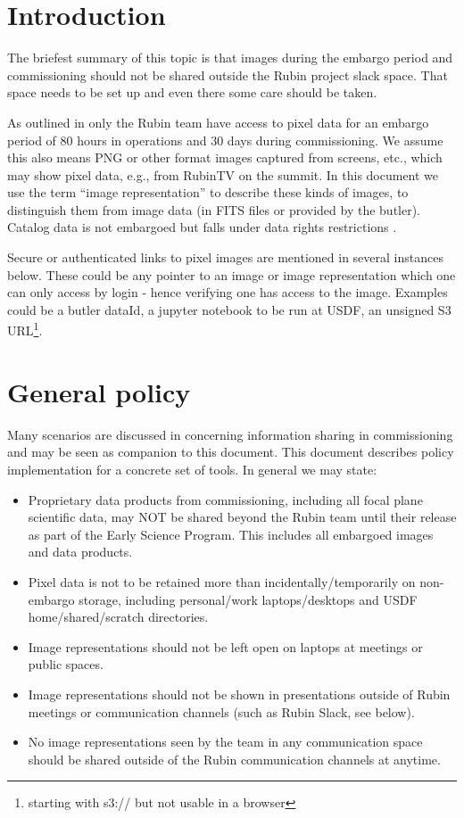 
\section{Introduction}
The briefest summary of this topic is that images during the embargo period and commissioning should not be shared outside the Rubin project slack space.
That space needs to be set up and even there some care should be taken.

As outlined in  only the Rubin team have access to pixel data for an embargo period of 80 hours in operations and 30 days during commissioning. We assume this also means PNG or other format images captured from screens, etc., which may show pixel data, e.g., from RubinTV on the summit.
In this document we use the term ``image representation'' to describe these kinds of images, to distinguish them from image data (in FITS files or provided by the butler).
Catalog data is not embargoed but falls under data rights restrictions .

Secure or authenticated links to pixel images are mentioned in several instances below.
These could be any pointer to an image or image representation which one can only access by login - hence verifying one has access to the image. Examples could be a butler dataId, a jupyter notebook to be run at USDF, an unsigned S3 URL\footnote{starting with s3:// but not usable in a browser}.


\section{General policy} \label{sec:genpol}
Many scenarios are discussed in  concerning information sharing in commissioning and may be seen as companion to this document.
This document describes policy implementation for a concrete set of tools.
In general we may state:

\begin{itemize}
\item Proprietary data products from commissioning, including all focal plane scientific data, may NOT be shared beyond the Rubin team until their release as part of the Early Science Program. This includes all embargoed images and data products.
\item Pixel data is not to be retained more than incidentally/temporarily on non-embargo storage, including personal/work laptops/desktops and USDF home/shared/scratch directories.
\item Image representations should not be left open on laptops at meetings or public spaces.
\item Image representations should not be shown in presentations outside of Rubin meetings or communication channels (such as Rubin Slack, see below).
\item No image representations seen by the team in any communication space should be shared outside of the Rubin communication channels at anytime.
\end{itemize}


